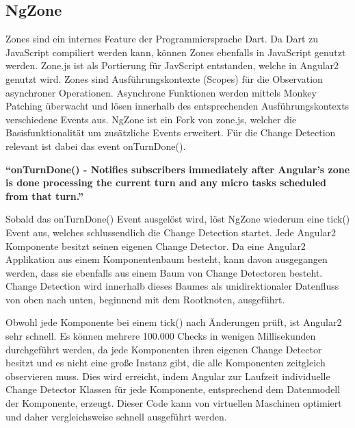 \subsection{NgZone}

Zones sind ein internes Feature der Programmiersprache Dart. Da Dart zu JavaScript compiliert werden kann,
können Zones ebenfalls in JavaScript genutzt werden. Zone.js ist als Portierung für JavScript entstanden, welche in Angular2 genutzt wird.
Zones sind Ausführungskontexte (Scopes) für die Observation asynchroner Operationen.
Asynchrone Funktionen werden mittels Monkey Patching überwacht und lösen innerhalb des entsprechenden Ausführungskontexts verschiedene Events aus.
NgZone ist ein Fork von zone.js, welcher die Basisfunktionalität um zusätzliche Events erweitert.
Für die Change Detection relevant ist dabei das event onTurnDone().
\cite{changedetection-explained}

\vspace{0.3cm}
\textbf{``onTurnDone() - Notifies subscribers immediately after Angular’s zone is done processing the current turn and any micro tasks scheduled from that turn.''}
\cite{ZONESINANGULAR2}
\vspace{0.3cm}

Sobald das onTurnDone() Event ausgelöst wird, löst NgZone wiederum eine tick() Event aus, welches schlussendlich die Change Detection startet.
Jede Angular2 Komponente besitzt seinen eigenen Change Detector. Da eine Angular2 Applikation aus einem Komponentenbaum besteht,
kann davon ausgegangen werden, dass sie ebenfalls aus einem Baum von Change Detectoren besteht.
Change Detection wird innerhalb dieses Baumes als unidirektionaler Datenfluss von oben nach unten, beginnend mit dem Rootknoten, ausgeführt.

Obwohl jede Komponente bei einem tick() nach Änderungen prüft, ist Angular2 sehr schnell. Es können mehrere 100.000 Checks in wenigen Millisekunden durchgeführt werden,
da jede Komponenten ihren eigenen Change Detector besitzt und es nicht eine große Instanz gibt, die alle Komponenten zeitgleich observieren muss.
Dies wird erreicht, indem Angular zur Laufzeit individuelle Change Detector Klassen für jede Komponente, entsprechend dem Datenmodell der Komponente, erzeugt.
Dieser Code kann von virtuellen Maschinen optimiert und daher vergleichsweise schnell ausgeführt werden.

\vspace{1cm}

